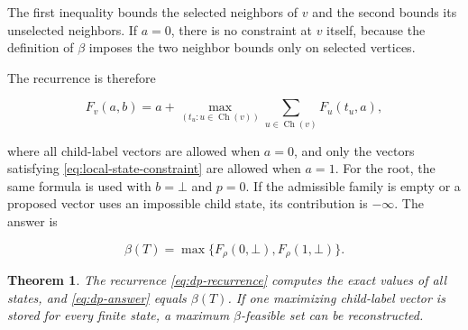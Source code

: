 \documentclass[11pt,a4paper]{article}
\newtheorem{theorem}{Theorem}[section]
\numberwithin{equation}{section}
\begin{document}
The first inequality bounds the selected neighbors of \(v\) and the
second bounds its unselected neighbors. If \(a=0\), there is no
constraint at \(v\) itself, because the definition of \(\beta\) imposes
the two neighbor bounds only on selected vertices.

The recurrence is therefore

\begin{equation}\label{eq:dp-recurrence}
F_v(a,b)
=a+
\max_{(t_u:u\in\operatorname{Ch}(v))}
\sum_{u\in\operatorname{Ch}(v)}F_u(t_u,a),
\end{equation}

where all child-label vectors are allowed when \(a=0\), and only the
vectors satisfying \eqref{eq:local-state-constraint} are allowed when \(a=1\). For the root, the
same formula is used with \(b=\bot\) and \(p=0\). If the admissible
family is empty or a proposed vector uses an impossible child state, its
contribution is \(-\infty\). The answer is

\begin{equation}\label{eq:dp-answer}
\beta(T)=\max\{F_\rho(0,\bot),F_\rho(1,\bot)\}.
\end{equation}

\begin{theorem}\label{thm:dp-correctness}
The recurrence \eqref{eq:dp-recurrence} computes the exact values of
all states, and \eqref{eq:dp-answer} equals \(\beta(T)\). If one maximizing child-label
vector is stored for every finite state, a maximum \(\beta\)-feasible
set can be reconstructed.
\end{theorem}
\end{document}
